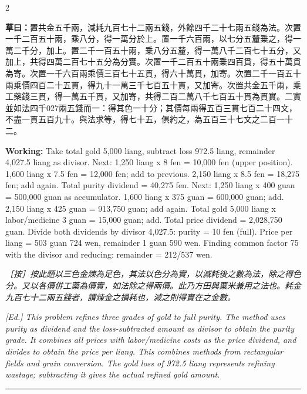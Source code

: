 \documentclass[11pt,a4paper]{article}
\newcommand{\longline}{\noindent\rule{\textwidth}{0.4pt}}
\newcommand{\WorkingText}[1]{\par\noindent\textbf{草曰：}#1\par}
\newcommand{\EdNoteText}[1]{\par\noindent\textit{\color{ednotecolor}［按］#1}\par}
\newcommand{\WorkingEn}[1]{\par\noindent\textbf{Working:} #1\par}
\newcommand{\EdNoteEn}[1]{\par\noindent\textit{\color{ednotecolor}[Ed.] #1}\par}
\begin{document}
\begin{paracol}{2}
\WorkingText{置共金五千兩，減耗九百七十二兩五錢，外餘四千二十七兩五錢為法。次置一千二百五十兩，乘八分，得一萬分於上。置一千六百兩，以七分五釐乗之，得一萬二千分，加上。置二千一百五十兩，乗八分五釐，得一萬八千二百七十五分，又加上，共得四萬二百七十五分為分實。次置一千二百五十兩乗四百貫，得五十萬貫為寄。次置一千六百兩乘價三百七十五貫，得六十萬貫，加寄。次置二千一百五十兩乗價四百二十五貫，得九十一萬三千七百五十貫，又加寄。次置共金五千兩，乗工藥錢三貫，得一萬五千貫，又加寄，共得二百二萬八千七百五十貫為貫實。二實並如法四千027兩五錢而一：得其色一十分；其價每兩得五百三貫七百二十四文，不盡一貫五百九十。與法求等，得七十五，俱約之，為五百三十七文之二百一十二。}
\switchcolumn
\WorkingEn{Take total gold 5,000 liang, subtract loss 972.5 liang, remainder 4,027.5 liang as divisor. Next: 1,250 liang x 8 fen = 10,000 fen (upper position). 1,600 liang x 7.5 fen = 12,000 fen; add to previous. 2,150 liang x 8.5 fen = 18,275 fen; add again. Total purity dividend = 40,275 fen. Next: 1,250 liang x 400 guan = 500,000 guan as accumulator. 1,600 liang x 375 guan = 600,000 guan; add. 2,150 liang x 425 guan = 913,750 guan; add again. Total gold 5,000 liang x labor/medicine 3 guan = 15,000 guan; add. Total price dividend = 2,028,750 guan. Divide both dividends by divisor 4,027.5: purity = 10 fen (full). Price per liang = 503 guan 724 wen, remainder 1 guan 590 wen. Finding common factor 75 with the divisor and reducing: remainder = 212/537 wen.}
\switchcolumn*

\EdNoteText{按此題以三色金煉為足色，其法以色分為實，以減耗後之數為法，除之得色分。又以各價併工藥為價實，如法除之得兩價。此乃方田與粟米兼用之法也。耗金九百七十二兩五錢者，謂煉金之損耗也，減之則得實在之金數。}
\switchcolumn
\EdNoteEn{This problem refines three grades of gold to full purity. The method uses purity as dividend and the loss-subtracted amount as divisor to obtain the purity grade. It combines all prices with labor/medicine costs as the price dividend, and divides to obtain the price per liang. This combines methods from rectangular fields and grain conversion. The gold loss of 972.5 liang represents refining wastage; subtracting it gives the actual refined gold amount.}

\end{paracol}

\longline
\end{document}
